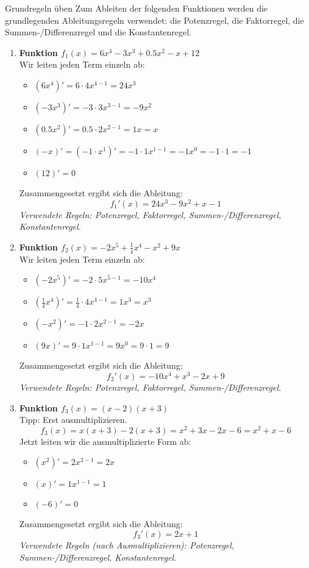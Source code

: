 \begin{loesungsumgebung}{Grundregeln üben}
Zum Ableiten der folgenden Funktionen werden die grundlegenden Ableitungsregeln verwendet: die Potenzregel, die Faktorregel, die Summen-/Differenzregel und die Konstantenregel.

\begin{enumerate}[label=(\alph*)]
    \item \textbf{Funktion $f_1(x) = 6x^4 - 3x^3 + 0.5x^2 - x + 12$} \\
    Wir leiten jeden Term einzeln ab:
    \begin{itemize}
        \item $(6x^4)' = 6 \cdot 4x^{4-1} = 24x^3$
        \item $(-3x^3)' = -3 \cdot 3x^{3-1} = -9x^2$
        \item $(0.5x^2)' = 0.5 \cdot 2x^{2-1} = 1x = x$
        \item $(-x)' = (-1 \cdot x^1)' = -1 \cdot 1x^{1-1} = -1x^0 = -1 \cdot 1 = -1$
        \item $(12)' = 0$
    \end{itemize}
    Zusammengesetzt ergibt sich die Ableitung:
    $$ f_1'(x) = 24x^3 - 9x^2 + x - 1 $$
    \textit{Verwendete Regeln: Potenzregel, Faktorregel, Summen-/Differenzregel, Konstantenregel.}

    \item \textbf{Funktion $f_2(x) = -2x^5 + \frac{1}{4}x^4 - x^2 + 9x$} \\
    Wir leiten jeden Term einzeln ab:
    \begin{itemize}
        \item $(-2x^5)' = -2 \cdot 5x^{5-1} = -10x^4$
        \item $(\frac{1}{4}x^4)' = \frac{1}{4} \cdot 4x^{4-1} = 1x^3 = x^3$
        \item $(-x^2)' = -1 \cdot 2x^{2-1} = -2x$
        \item $(9x)' = 9 \cdot 1x^{1-1} = 9x^0 = 9 \cdot 1 = 9$
    \end{itemize}
    Zusammengesetzt ergibt sich die Ableitung:
    $$ f_2'(x) = -10x^4 + x^3 - 2x + 9 $$
    \textit{Verwendete Regeln: Potenzregel, Faktorregel, Summen-/Differenzregel.}

    \item \textbf{Funktion $f_3(x) = (x-2)(x+3)$} \\
    Tipp: Erst ausmultiplizieren.
    $$ f_3(x) = x(x+3) - 2(x+3) = x^2 + 3x - 2x - 6 = x^2 + x - 6 $$
    Jetzt leiten wir die ausmultiplizierte Form ab:
    \begin{itemize}
        \item $(x^2)' = 2x^{2-1} = 2x$
        \item $(x)' = 1x^{1-1} = 1$
        \item $(-6)' = 0$
    \end{itemize}
    Zusammengesetzt ergibt sich die Ableitung:
    $$ f_3'(x) = 2x + 1 $$
    \textit{Verwendete Regeln (nach Ausmultiplizieren): Potenzregel, Summen-/Differenzregel, Konstantenregel.}


\end{enumerate}
\end{loesungsumgebung}
